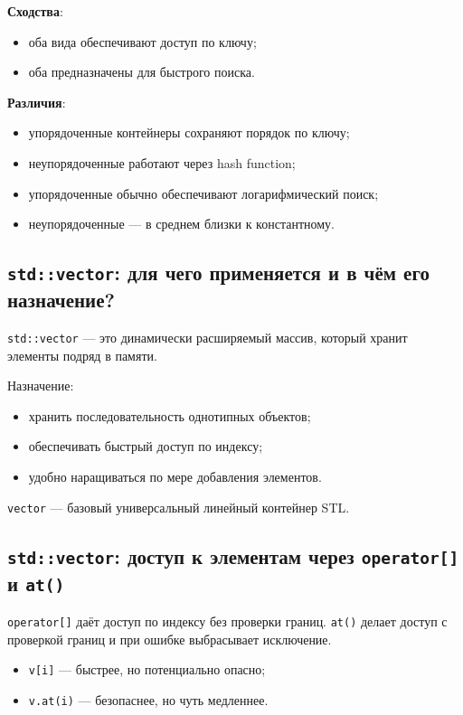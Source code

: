 \textbf{Сходства}:
\begin{itemize}
    \item оба вида обеспечивают доступ по ключу;
    \item оба предназначены для быстрого поиска.
\end{itemize}

\textbf{Различия}:
\begin{itemize}
    \item упорядоченные контейнеры сохраняют порядок по ключу;
    \item неупорядоченные работают через hash function;
    \item упорядоченные обычно обеспечивают логарифмический поиск;
    \item неупорядоченные — в среднем близки к константному.
\end{itemize}

\subsection{\texttt{std::vector}: для чего применяется и в чём его назначение?}
\begin{definition}
\texttt{std::vector} — это динамически расширяемый массив, который хранит элементы подряд в памяти.
\end{definition}

Назначение:
\begin{itemize}
    \item хранить последовательность однотипных объектов;
    \item обеспечивать быстрый доступ по индексу;
    \item удобно наращиваться по мере добавления элементов.
\end{itemize}

\begin{remark}
\texttt{vector} — базовый универсальный линейный контейнер STL.
\end{remark}

\subsection{\texttt{std::vector}: доступ к элементам через \texttt{operator[]} и \texttt{at()}}
\texttt{operator[]} даёт доступ по индексу без проверки границ.  
\texttt{at()} делает доступ с проверкой границ и при ошибке выбрасывает исключение.

\begin{itemize}
    \item \texttt{v[i]} — быстрее, но потенциально опасно;
    \item \texttt{v.at(i)} — безопаснее, но чуть медленнее.
\end{itemize}

